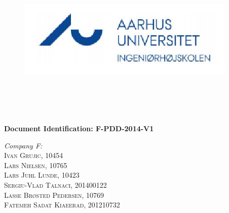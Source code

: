 \begin{titlepage}
\begin{center}



\begin{figure}
\includegraphics[scale=0.5]{./images/logo.png}\\
\\   
\\
\end{figure}
\\[0.5cm]
\\[2cm]

{ \bfseries Document Identification: F-PDD-2014-V1}\\[2cm]



\begin{flushleft} \large
\emph{Company F:}\\
\textsc{Ivan Grujic, 10454\\}
\textsc{Lars Nielsen, 10765\\}
\textsc{Lars Juhl Lunde, 10423\\}
\textsc{Sergiu-Vlad Talnaci, 201400122\\}
\textsc{Lasse Br\o sted Pedersen, 10769\\}
\textsc{Fatemeh Sadat Kiaeerad, 201210732\\}\\[2cm]
 \\ 
\\
\end{flushleft}\\




\end{center}
\end{titlepage}
